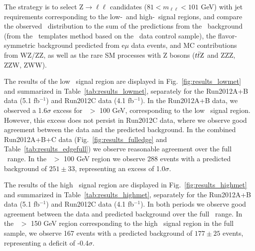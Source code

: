 The strategy is to select Z$\to\ell\ell$ candidates ($81<m_{\ell\ell}<101$ GeV) with jet requirements corresponding to the
low-\MET\ and high-\MET\ signal regions, and compare the observed \MET\ distribution to the sum of the predictions from the 
\zjets\ background (from the \MET\ templates method based on the \gjets\ data control sample), the flavor-symmetric background predicted
from e$\mu$ data events, and MC contributions from WZ/ZZ, as well as the rare SM processes with Z bosons ($t\bar{t}\rm{Z}$ and ZZZ, ZZW, ZWW).

The results of the low \MET\ signal region are displayed in Fig.~\ref{fig:results_lowmet} and summarized in Table~\ref{tab:results_lowmet},
separately for the Run2012A+B data (5.1 fb$^{-1}$) and Run2012C data (4.1 fb$^{-1}$).
In the Run2012A+B data, we observed a 1.6$\sigma$ excess for \MET\ $>$ 100 GeV, corresponding to the low \MET\ signal region.
However, this excess does not persist in Run2012C data, where we observe good agreement between the data and the predicted background.
In the combined Run2012A+B+C data (Fig.~\ref{fig:results_fulledge} and Table~\ref{tab:results_edgefull}) we observe reasonable
agreement over the full \MET\ range. In the \MET\ $>$ 100 GeV region we observe 288 events with a predicted background of $251\pm33$,
representing an excess of 1.0$\sigma$.

The results of the high \MET\ signal region are displayed in Fig.~\ref{fig:results_highmet} and summarized in Table~\ref{tab:results_highmet},
separately for the Run2012A+B data (5.1 fb$^{-1}$) and Run2012C data (4.1 fb$^{-1}$).
In both periods we observe good agreement between the data and predicted background over the full \MET\ range.
In the \MET\ $>$ 150 GeV region corresponding to the high \MET\ signal region in the full sample, we observe 167 events with a predicted
background of $177\pm25$ events, representing a deficit of -0.4$\sigma$.

\clearpage

